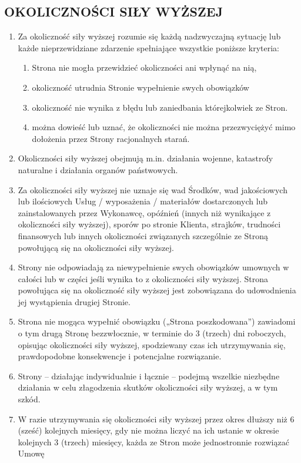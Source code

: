 \begin{multicols}{2}
\subsection{OKOLICZNOŚCI SIŁY WYŻSZEJ}
\begin{enumerate}
	\item Za okoliczność siły wyższej rozumie się każdą nadzwyczajną sytuację lub każde nieprzewidziane zdarzenie spełniające wszystkie poniższe kryteria:
	\begin{enumerate}
		\item Strona nie mogła przewidzieć okoliczności ani wpłynąć na nią,
		\item okoliczność utrudnia Stronie wypełnienie swych obowiązków
		\item okoliczność nie wynika z błędu lub zaniedbania którejkolwiek ze Stron.
		\item można dowieść lub uznać, że okoliczności nie można przezwyciężyć mimo dołożenia przez Strony racjonalnych starań.
	\end{enumerate}
	\item Okoliczności siły wyższej obejmują m.in. działania wojenne, katastrofy naturalne i działania organów państwowych.
	\item Za okoliczności siły wyższej nie uznaje się wad Środków, wad jakościowych lub ilościowych Usług / wyposażenia / materiałów dostarczonych lub zainstalowanych przez Wykonawcę, opóźnień (innych niż wynikające z okoliczności siły wyższej), sporów po stronie Klienta, strajków, trudności finansowych lub innych okoliczności związanych szczególnie ze Stroną powołującą się na okoliczności siły wyższej.
	\item Strony nie odpowiadają za niewypełnienie swych obowiązków umownych w całości lub w części jeśli wynika to z okoliczności siły wyższej. Strona powołująca się na okoliczność siły wyższej jest zobowiązana do udowodnienia jej wystąpienia drugiej Stronie.
	\item Strona nie mogąca wypełnić obowiązku („Strona poszkodowana”) zawiadomi o tym drugą Stronę bezzwłocznie, w terminie do 3 (trzech) dni roboczych, opisując okoliczności siły wyższej, spodziewany czas ich utrzymywania się, prawdopodobne konsekwencje i potencjalne rozwiązanie.
	\item Strony – działając indywidualnie i łącznie – podejmą wszelkie niezbędne działania w celu złagodzenia skutków okoliczności siły wyższej, a w tym szkód.
	\item W razie utrzymywania się okoliczności siły wyższej przez okres dłuższy niż 6 (sześć) kolejnych miesięcy, gdy nie można liczyć na ich ustanie w okresie kolejnych 3 (trzech) miesięcy, każda ze Stron może jednostronnie rozwiązać Umowę
\end{enumerate}


\end{multicols}
